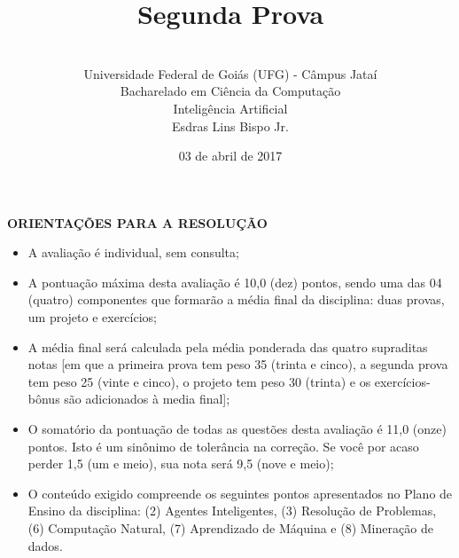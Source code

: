\documentclass[12pt,a4paper,oneside]{article}
\author{\\Universidade Federal de Goiás (UFG) - Câmpus Jataí\\Bacharelado em Ciência da Computação \\Inteligência Artificial \\Esdras Lins Bispo Jr.}
\title{\sc \huge Segunda Prova}
\date{03 de abril de 2017}
\begin{document}
\maketitle

{\bf ORIENTAÇÕES PARA A RESOLUÇÃO}

\begin{itemize}
	\item A avaliação é individual, sem consulta;
	\item A pontuação máxima desta avaliação é 10,0 (dez) pontos, sendo uma das 04 (quatro) componentes que formarão a média final da disciplina: duas provas, um projeto e exercícios;
	\item A média final será calculada pela média ponderada das quatro supraditas notas [em que a primeira prova tem peso 35 (trinta e cinco), a segunda prova tem peso 25 (vinte e cinco), o projeto tem peso 30 (trinta) e os exercícios-bônus são adicionados à media final];
	\item O somatório da pontuação de todas as questões desta avaliação é 11,0 (onze) pontos. Isto é um sinônimo de tolerância na correção. Se você por acaso perder 1,5 (um e meio), sua nota será 9,5 (nove e meio);
	\item O conteúdo exigido compreende os seguintes pontos apresentados no Plano de Ensino da disciplina: (2) Agentes Inteligentes, (3) Resolução de Problemas, (6) Computação Natural, (7) Aprendizado de Máquina e (8) Mineração de dados.
\end{itemize}

\begin{center}
\end{center}

\newpage
\end{document}
